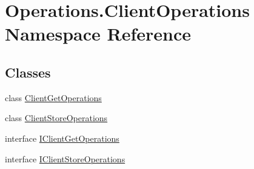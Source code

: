\hypertarget{namespace_operations_1_1_client_operations}{}\section{Operations.\+Client\+Operations Namespace Reference}
\label{namespace_operations_1_1_client_operations}
\subsection*{Classes}
\begin{DoxyCompactItemize}
\item 
class \hyperlink{class_operations_1_1_client_operations_1_1_client_get_operations}{Client\+Get\+Operations}
\item 
class \hyperlink{class_operations_1_1_client_operations_1_1_client_store_operations}{Client\+Store\+Operations}
\item 
interface \hyperlink{interface_operations_1_1_client_operations_1_1_i_client_get_operations}{I\+Client\+Get\+Operations}
\item 
interface \hyperlink{interface_operations_1_1_client_operations_1_1_i_client_store_operations}{I\+Client\+Store\+Operations}
\end{DoxyCompactItemize}
